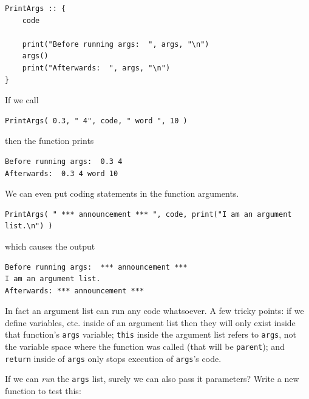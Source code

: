 \documentclass{article}
\newenvironment{code}{
       \begin{list}{}{
               \setlength{\leftmargin}{.4in}
               \setlength{\rightmargin}{0in}
               \setlength{\topsep}{.2in}
       }
       \small
       \item[] }
       { \end{list}   }
\begin{document}
\begin{code} \begin{verbatim}
PrintArgs :: {
    code
    
    print("Before running args:  ", args, "\n")
    args()
    print("Afterwards:  ", args, "\n")
}
\end{verbatim} \end{code}

\noindent If we call

\begin{code} \begin{verbatim}
PrintArgs( 0.3, " 4", code, " word ", 10 )
\end{verbatim} \end{code}

\noindent then the function prints

\begin{code} \begin{verbatim}
Before running args:  0.3 4
Afterwards:  0.3 4 word 10
\end{verbatim} \end{code}

\noindent We can even put coding statements in the function arguments.

\begin{code} \begin{verbatim}
PrintArgs( " *** announcement *** ", code, print("I am an argument list.\n") )
\end{verbatim} \end{code}

\noindent which causes the output

\begin{code} \begin{verbatim}
Before running args:  *** announcement *** 
I am an argument list.
Afterwards: *** announcement *** 
\end{verbatim} \end{code}

\noindent In fact an argument list can run any code whatsoever.  A few tricky points:  if we define variables, etc. inside of an argument list then they will only exist inside that function's \verb#args# variable; \verb#this# inside the argument list refers to \verb#args#, not the variable space where the function was called (that will be \verb#parent#); and \verb#return# inside of \verb#args# only stops execution of \verb#args#'s code.

If we can \emph{run} the \texttt{args} list, surely we can also pass it parameters?  Write a new function to test this:
\end{document}
